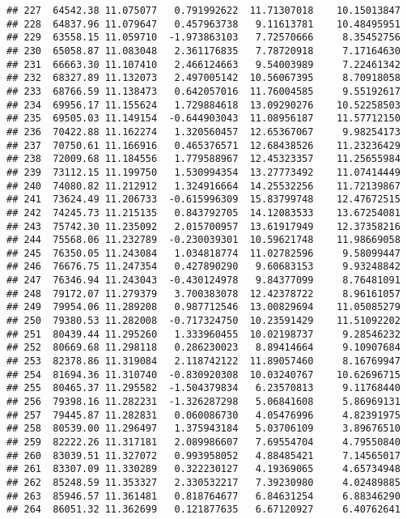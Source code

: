 \documentclass[
]{article}
\begin{document}
\begin{verbatim}
## 227  64542.38 11.075077   0.791992622  11.71307018    10.15013847
## 228  64837.96 11.079647   0.457963738   9.11613781    10.48495951
## 229  63558.15 11.059710  -1.973863103   7.72570666     8.35452756
## 230  65058.87 11.083048   2.361176835   7.78720918     7.17164630
## 231  66663.30 11.107410   2.466124663   9.54003989     7.22461342
## 232  68327.89 11.132073   2.497005142  10.56067395     8.70918058
## 233  68766.59 11.138473   0.642057016  11.76004585     9.55192617
## 234  69956.17 11.155624   1.729884618  13.09290276    10.52258503
## 235  69505.03 11.149154  -0.644903043  11.08956187    11.57712150
## 236  70422.88 11.162274   1.320560457  12.65367067     9.98254173
## 237  70750.61 11.166916   0.465376571  12.68438526    11.23236429
## 238  72009.68 11.184556   1.779588967  12.45323357    11.25655984
## 239  73112.15 11.199750   1.530994354  13.27773492    11.07414449
## 240  74080.82 11.212912   1.324916664  14.25532256    11.72139867
## 241  73624.49 11.206733  -0.615996309  15.83799748    12.47672515
## 242  74245.73 11.215135   0.843792705  14.12083533    13.67254081
## 243  75742.30 11.235092   2.015700957  13.61917949    12.37358216
## 244  75568.06 11.232789  -0.230039301  10.59621748    11.98669058
## 245  76350.05 11.243084   1.034818774  11.02782596     9.58099447
## 246  76676.75 11.247354   0.427890290   9.60683153     9.93248842
## 247  76346.94 11.243043  -0.430124978   9.84377099     8.76481091
## 248  79172.07 11.279379   3.700383078  12.42378722     8.96161057
## 249  79954.06 11.289208   0.987712546  13.00829694    11.05085279
## 250  79380.53 11.282008  -0.717324750  10.23591429    11.51092202
## 251  80439.44 11.295260   1.333960455  10.02198737     9.28546232
## 252  80669.68 11.298118   0.286230023   8.89414664     9.10907684
## 253  82378.86 11.319084   2.118742122  11.89057460     8.16769947
## 254  81694.36 11.310740  -0.830920308  10.03240767    10.62696715
## 255  80465.37 11.295582  -1.504379834   6.23570813     9.11768440
## 256  79398.16 11.282231  -1.326287298   5.06841608     5.86969131
## 257  79445.87 11.282831   0.060086730   4.05476996     4.82391975
## 258  80539.00 11.296497   1.375943184   5.03706109     3.89676510
## 259  82222.26 11.317181   2.089986607   7.69554704     4.79550840
## 260  83039.51 11.327072   0.993958052   4.88485421     7.14565017
## 261  83307.09 11.330289   0.322230127   4.19369065     4.65734948
## 262  85248.59 11.353327   2.330532217   7.39230980     4.02489885
## 263  85946.57 11.361481   0.818764677   6.84631254     6.88346290
## 264  86051.32 11.362699   0.121877635   6.67120927     6.40762641

\end{verbatim}
\end{document}
